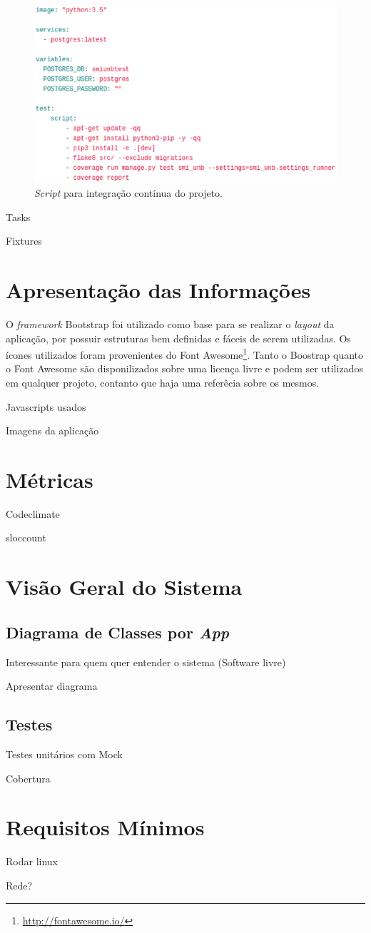 \begin{figure}[!h]
    \centering
    \includegraphics[keepaspectratio=true,scale=0.65]{figuras/integracao.eps}
    \caption{\textit{Script} para integração contínua do projeto.}
    \label{integracao}
\end{figure}

Tasks

Fixtures

\section{Apresentação das Informações}
O \textit{framework} Bootstrap foi utilizado como base para se realizar o \textit{layout} da aplicação, por possuir estruturas bem definidas e fáceis de serem utilizadas. Os ícones utilizados foram provenientes do Font Awesome\footnote{\url{http://fontawesome.io/}}. Tanto o Boostrap quanto o Font Awesome são disponilizados sobre uma licença livre e podem ser utilizados em qualquer projeto, contanto que haja uma referêcia sobre os mesmos.

Javascripts usados

Imagens da aplicação
\section{Métricas}
Codeclimate

sloccount

\section{Visão Geral do Sistema}
    \subsection{Diagrama de Classes por \textit{App}}
    Interessante para quem quer entender o sistema (Software livre)

    Apresentar diagrama
    \subsection{Testes}
    Testes unitários com Mock

    Cobertura
    \section{Requisitos Mínimos}
    Rodar linux

    Rede?
